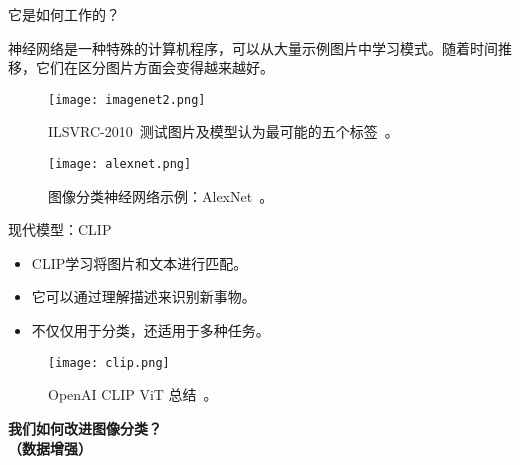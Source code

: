 \begin{refsection}
  \begin{frame}{它是如何工作的？}
    \begin{flushleft}
    神经网络是一种特殊的计算机程序，可以从大量示例图片中学习模式。随着时间推移，它们在区分图片方面会变得越来越好。
    \end{flushleft}
    \begin{figure}
      \begin{minipage}{0.48\linewidth}
        \centering
        \texttt{[image: imagenet2.png]}
        \caption[]{\scriptsize ILSVRC-2010~\parencite{imagenet2010challenge}测试图片及模型认为最可能的五个标签~\parencite{krizhevskyImageNetClassificationDeep2012}。}
      \end{minipage}%
      \hfill
      \begin{minipage}{0.48\linewidth}
        \centering
        \texttt{[image: alexnet.png]}
        \caption[]{\scriptsize 图像分类神经网络示例：AlexNet~\parencite{krizhevskyImageNetClassificationDeep2012}。}
      \end{minipage}
    \end{figure}
    \bottomleftrefs
  \end{frame}
  \end{refsection}



\begin{refsection}
\begin{frame}{现代模型：CLIP}
  \begin{itemize}
    \item CLIP学习将图片和文本进行匹配。
    \item 它可以通过理解描述来识别新事物。
    \item 不仅仅用于分类，还适用于多种任务。
  \end{itemize}
  \centering
  \begin{figure}
    \centering
    \texttt{[image: clip.png]}
    \caption[]{\scriptsize OpenAI CLIP ViT 总结~\parencite{radfordLearningTransferableVisual2021}。}
  \end{figure}
  \bottomleftrefs
\end{frame}
\end{refsection}



\begin{refsection}
\begin{frame}
  \centering
  \vspace{2.5cm}
  {\LARGE \textbf{我们如何改进图像分类？}\\[0.5em]
  \textbf{（数据增强）}}
\end{frame}
\end{refsection}

